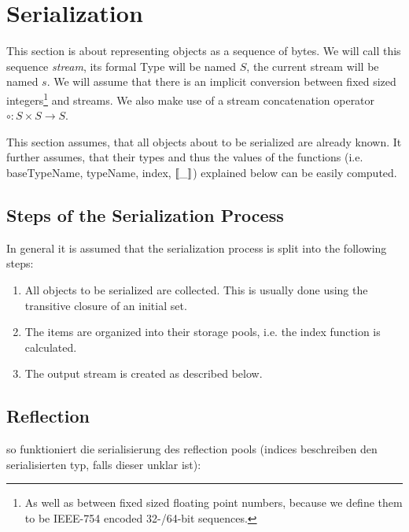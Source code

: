 
\section{Serialization}
\label{serialization}

This section is about representing objects as a sequence of bytes. We will call this sequence \textit{stream}, its formal Type will be named $S$, the current stream will be named $s$. We will assume that there is an implicit conversion between fixed sized integers\footnote{As well as between fixed sized floating point numbers, because we define them to be IEEE-754 encoded 32-/64-bit sequences.} and streams. We also make use of a stream concatenation operator $\circ : S \times S → S$.

This section assumes, that all objects about to be serialized are already known. It further assumes, that their types and thus the values of the functions (i.e. baseTypeName, typeName, index, $[\![\_]\!]$) explained below can be easily computed.


\subsection{Steps of the Serialization Process}

In general it is assumed that the serialization process is split into the following steps:
\begin{enumerate}
 \item All objects to be serialized are collected. This is usually done using the transitive closure of an initial set.
 
 \item The items are organized into their storage pools, i.e. the index function is calculated.
 
 \item The output stream is created as described below.
\end{enumerate}

\subsection{Reflection}

so funktioniert die serialisierung des reflection pools (indices beschreiben den serialisierten typ, falls dieser unklar ist):

